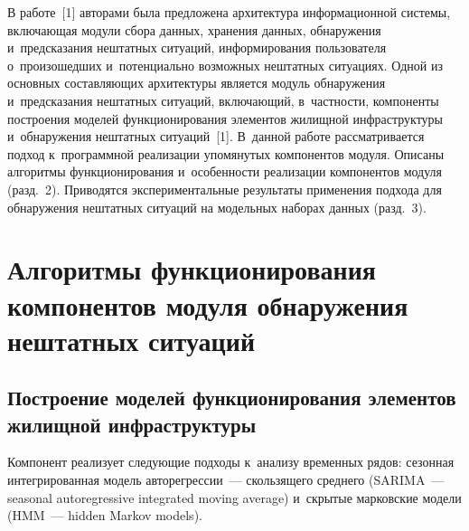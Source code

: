 \begin{multicols}{2}
      В работе~[1] авторами была предложена архитектура информационной 
системы, включающая модули сбора данных, хранения данных, обнаружения 
и~предсказания нештатных ситуаций, информирования пользователя 
о~произошедших и~потенциально возможных нештатных ситуациях. Одной из 
основных составляющих архитектуры является модуль обнаружения 
и~предсказания нештатных ситуаций, включающий, в~част\-ности, компоненты 
построения моделей функционирования элементов жилищной инфраструктуры 
и~обнаружения нештатных ситуаций~[1]. В~данной работе рас\-смат\-ри\-ва\-ет\-ся 
подход к~программной реализации упомянутых компонентов модуля. Описаны 
алгоритмы функционирования и~особенности реализации компонентов модуля 
(разд.~2). Приводятся экспериментальные результаты применения подхода для 
обнаружения нештатных ситуаций на модельных наборах данных (разд.~3).
      
\section{Алгоритмы функционирования компонентов модуля 
обнаружения нештатных ситуаций}

\subsection{Построение моделей функционирования элементов жилищной 
инфраструктуры}

      Компонент реализует следующие подходы к~анализу временных рядов: 
сезонная интегрированная модель авторегрессии~--- скользящего среднего 
(SARIMA~--- seasonal autoregressive integrated moving average) 
и~скрытые марковские модели (HMM~--- hidden Markov models).
      

\end{multicols}
